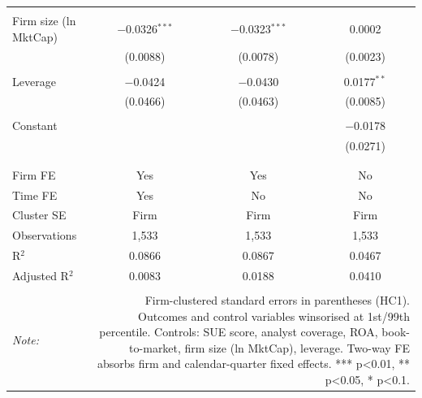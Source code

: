 \begin{table}[!htbp]
\begin{tabular}{@{\extracolsep{5pt}}lccc}
  & & & \\ 
 Firm size (ln MktCap) & $-$0.0326$^{***}$ & $-$0.0323$^{***}$ & 0.0002 \\ 
  & (0.0088) & (0.0078) & (0.0023) \\ 
  & & & \\ 
 Leverage & $-$0.0424 & $-$0.0430 & 0.0177$^{**}$ \\ 
  & (0.0466) & (0.0463) & (0.0085) \\ 
  & & & \\ 
 Constant &  &  & $-$0.0178 \\ 
  &  &  & (0.0271) \\ 
  & & & \\ 
\hline \\[-1.8ex] 
Firm FE & Yes & Yes & No \\ 
Time FE & Yes & No & No \\ 
Cluster SE & Firm & Firm & Firm \\ 
Observations & 1,533 & 1,533 & 1,533 \\ 
R$^{2}$ & 0.0866 & 0.0867 & 0.0467 \\ 
Adjusted R$^{2}$ & 0.0083 & 0.0188 & 0.0410 \\ 
\hline 
\hline \\[-1.8ex] 
\textit{Note:}  & \multicolumn{3}{r}{Firm-clustered standard errors in parentheses (HC1). Outcomes and control variables winsorised at 1st/99th percentile. Controls: SUE score, analyst coverage, ROA, book-to-market, firm size (ln MktCap), leverage. Two-way FE absorbs firm and calendar-quarter fixed effects. *** p<0.01, ** p<0.05, * p<0.1.} \\ 
\end{tabular} 
\end{table} 
